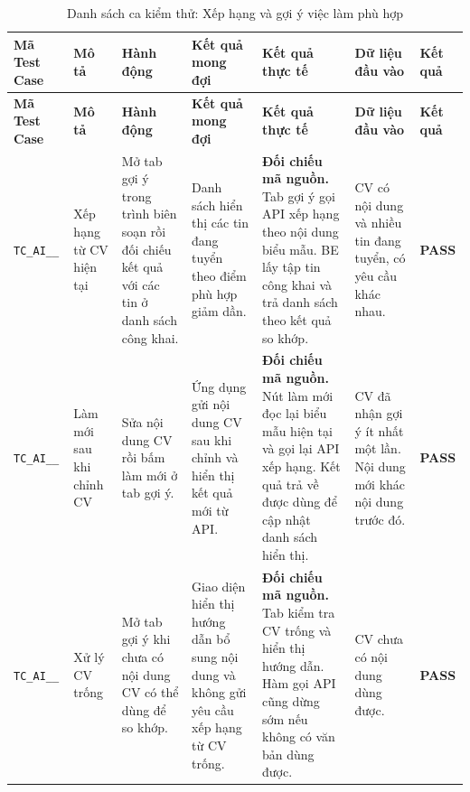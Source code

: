 \begin{landscape}
{
\fontsize{9.5}{11.5}\selectfont
\setlength{\tabcolsep}{3pt}
\renewcommand{\arraystretch}{1.2}
\begin{longtable}{|>{\raggedright\arraybackslash}p{2.1cm}|>{\raggedright\arraybackslash}p{2.8cm}|>{\raggedright\arraybackslash}p{3.8cm}|>{\raggedright\arraybackslash}p{4.0cm}|>{\raggedright\arraybackslash}p{5.0cm}|>{\raggedright\arraybackslash}p{3.2cm}|>{\centering\arraybackslash}p{1.3cm}|}
    \caption{Danh sách ca kiểm thử: Xếp hạng và gợi ý việc làm phù hợp} \label{tab:ts-ai-02} \\
    \hline
    \textbf{Mã Test Case} & \textbf{Mô tả} & \textbf{Hành động} & \textbf{Kết quả mong đợi} & \textbf{Kết quả thực tế} & \textbf{Dữ liệu đầu vào} & \textbf{Kết quả} \\
    \hline
    \endfirsthead
    \hline
    \textbf{Mã Test Case} & \textbf{Mô tả} & \textbf{Hành động} & \textbf{Kết quả mong đợi} & \textbf{Kết quả thực tế} & \textbf{Dữ liệu đầu vào} & \textbf{Kết quả} \\
    \hline
    \endhead
    \hline
    \endfoot
    \hline
    \endlastfoot
    \texttt{TC\_\allowbreak AI\_\allowbreak 02\_\allowbreak 01} & Xếp hạng từ CV hiện tại & Mở tab gợi ý trong trình biên soạn rồi đối chiếu kết quả với các tin ở danh sách công khai. & Danh sách hiển thị các tin đang tuyển theo điểm phù hợp giảm dần. & \textbf{Đối chiếu mã nguồn.} Tab gợi ý gọi API xếp hạng theo nội dung biểu mẫu. BE lấy tập tin công khai và trả danh sách theo kết quả so khớp. & CV có nội dung và nhiều tin đang tuyển, có yêu cầu khác nhau. & \textbf{PASS} \\
    \hline
    \texttt{TC\_\allowbreak AI\_\allowbreak 02\_\allowbreak 02} & Làm mới sau khi chỉnh CV & Sửa nội dung CV rồi bấm làm mới ở tab gợi ý. & Ứng dụng gửi nội dung CV sau khi chỉnh và hiển thị kết quả mới từ API. & \textbf{Đối chiếu mã nguồn.} Nút làm mới đọc lại biểu mẫu hiện tại và gọi lại API xếp hạng. Kết quả trả về được dùng để cập nhật danh sách hiển thị. & CV đã nhận gợi ý ít nhất một lần. Nội dung mới khác nội dung trước đó. & \textbf{PASS} \\
    \hline
    \texttt{TC\_\allowbreak AI\_\allowbreak 02\_\allowbreak 03} & Xử lý CV trống & Mở tab gợi ý khi chưa có nội dung CV có thể dùng để so khớp. & Giao diện hiển thị hướng dẫn bổ sung nội dung và không gửi yêu cầu xếp hạng từ CV trống. & \textbf{Đối chiếu mã nguồn.} Tab kiểm tra CV trống và hiển thị hướng dẫn. Hàm gọi API cũng dừng sớm nếu không có văn bản dùng được. & CV chưa có nội dung dùng được. & \textbf{PASS} \\

\end{longtable}}
\end{landscape}
